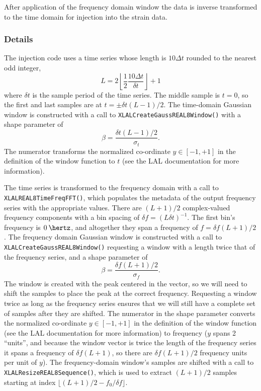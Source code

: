 \documentclass[10pt]{article}
\begin{document}
After application of the frequency domain window the data is inverse
transformed to the time domain for injection into the strain data.


\subsubsection{Details}


The injection code uses a time series whose length is \(10 \Delta t\)
rounded to the nearest odd integer,
\begin{equation}
L
   = 2 \left\lfloor \frac{1}{2} \frac{10 \Delta t}{\delta t} \right\rfloor
   + 1
\end{equation}
where \(\delta t\) is the sample period of the time series.  The middle
sample is \(t = 0\), so the first and last samples are at \(t = \pm \delta
t (L - 1) / 2\).  The time-domain Gaussian window is constructed with a
call to \texttt{XLALCreateGaussREAL8Window()} with a shape parameter of
\begin{equation}
\beta
   = \frac{\delta t (L - 1) / 2}{\sigma_{t}}.
\end{equation}
The numerator transforms the normalized co-ordinate \(y \in [-1, +1]\) in
the definition of the window function to \(t\) (see the LAL documentation
for more information).

The time series is transformed to the frequency domain with a call to
\texttt{XLALREAL8TimeFreqFFT()}, which populates the metadata of the output
frequency series with the appropriate values.  There are \((L + 1) / 2\)
complex-valued frequency components with a bin spacing of \(\delta f = (L
\delta t)^{-1}\).  The first bin's frequency is \(\unit{0}{\hertz}\), and
altogether they span a frequency of \(f = \delta f (L + 1) / 2\).  The
frequency domain Gaussian window is constructed with a call to
\texttt{XLALCreateGaussREAL8Window()} requesting a window with a length
twice that of the frequency series, and a shape parameter of
\begin{equation}
\beta
   = \frac{\delta f (L + 1) / 2}{\sigma_{f}}.
\end{equation}
The window is created with the peak centered in the vector, so we will need
to shift the samples to place the peak at the correct frequency.
Requesting a window twice as long as the frequency series ensures that we
will still have a complete set of samples after they are shifted.  The
numerator in the shape parameter converts the normalized co-ordinate \(y
\in [-1, +1]\) in the definition of the window function (see the LAL
documentation for more information) to frequency (\(y\) spans 2 ``units'',
and because the window vector is twice the length of the frequency series
it spans a frequency of \(\delta f (L + 1)\), so there are \(\delta f (L +
1) / 2\) frequency units per unit of \(y\)).  The frequency-domain window's
samples are shifted with a call to \texttt{XLALResizeREAL8Sequence()},
which is used to extract \((L + 1) / 2\) samples starting at index
\(\lfloor (L + 1) / 2 - f_{0} / \delta f \rfloor\).
\end{document}
